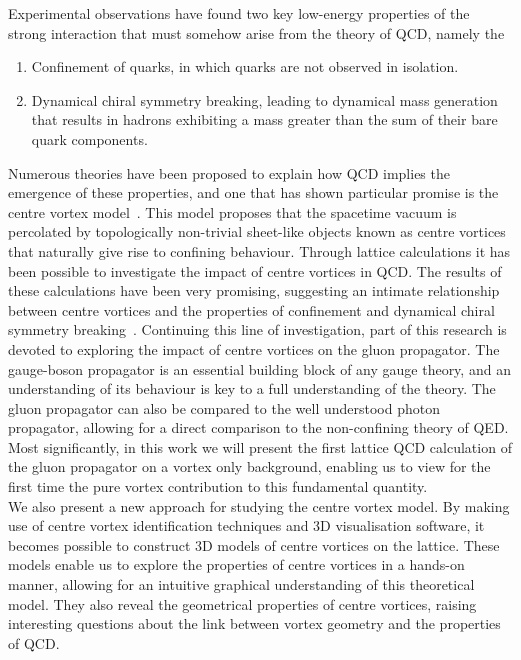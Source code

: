 Experimental observations have found two key low-energy properties of the strong interaction that must somehow arise from the theory of QCD, namely the
%
\begin{enumerate}
\item Confinement of quarks, in which quarks are not observed in isolation.
\item Dynamical chiral symmetry breaking, leading to dynamical mass generation that results in hadrons exhibiting a mass greater than the sum of their bare quark components.
\end{enumerate}
%
Numerous theories have been proposed to explain how QCD implies the emergence of these properties, and one that has shown particular promise is the centre vortex model~\cite{Nielsen:1979xu,DelDebbio:1996lih,'tHooft:1977hy}. This model proposes that the spacetime vacuum is percolated by topologically non-trivial sheet-like objects known as centre vortices that naturally give rise to confining behaviour. Through lattice calculations it has been possible to investigate the impact of centre vortices in QCD. The results of these calculations have been very promising, suggesting an intimate relationship between centre vortices and the properties of confinement and dynamical chiral symmetry breaking~\cite{Biddle:2018dtc,Bowman:2008qd,Trewartha:2015ida,Trewartha:2015nna,Trewartha:2017ive,Greensite:2003bk,OMalley:2011aa,Bowman:2010zr}. Continuing this line of investigation, part of this research is devoted to exploring the impact of centre vortices on the gluon propagator. The gauge-boson propagator is an essential building block of any gauge theory, and an understanding of its behaviour is key to a full understanding of the theory. The gluon propagator can also be compared to the well understood photon propagator, allowing for a direct comparison to the non-confining theory of QED. Most significantly, in this work we will present the first lattice QCD calculation of the gluon propagator on a vortex only background, enabling us to view for the first time the pure vortex contribution to this fundamental quantity.\\

We also present a new approach for studying the centre vortex model. By making use of centre vortex identification techniques and 3D visualisation software, it becomes possible to construct 3D models of centre vortices on the lattice. These models enable us to explore the properties of centre vortices in a hands-on manner, allowing for an intuitive graphical understanding of this theoretical model. They also reveal the geometrical properties of centre vortices, raising interesting questions about the link between vortex geometry and the properties of QCD.\\

